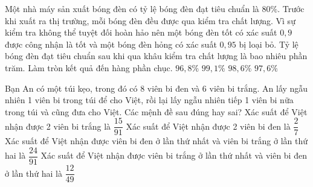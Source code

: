 \begin{ex}%
    Một nhà máy sản xuất bóng đèn có tỷ lệ bóng đèn đạt tiêu chuẩn là $80\%$. Trước khi xuất ra thị trường, mỗi bóng đèn đều được qua kiểm tra chất lượng. Vì sự kiểm tra không thể tuyệt đối hoàn hảo nên một bóng đèn tốt có xác suất $0,9$ được công nhận là tốt và một bóng đèn hỏng có xác suất $0,95$ bị loại bỏ. Tỷ lệ bóng đèn đạt tiêu chuẩn sau khi qua khâu kiểm tra chất lượng là bao nhiêu phần trăm. Làm tròn kết quả đến hàng phần chục.
    \choice
    {$96,8\%$}
    {$99,1\%$}
    {\True $98,6\%$}
    {$97,6\%$}
\end{ex}
\begin{ex}%
    Bạn An có một túi kẹo, trong đó có 8 viên bi đen và 6 viên bi trắng. An lấy ngẫu nhiên 1 viên bi trong túi để cho Việt, rồi lại lấy ngẫu nhiên tiếp 1 viên bi nữa trong túi và cũng đưa cho Việt. Các mệnh đề sau đúng hay sai?
    \choiceTF
    {\True Xác suất để Việt nhận được 2 viên bi trắng là $\dfrac{15}{91}$}
    { Xác suất để Việt nhận được 2 viên bi đen là $\dfrac{2}{7}$}
    {\True Xác suất để Việt nhận được viên bi đen ở lần thứ nhất và viên bi trắng ở lần thứ hai là $\dfrac{24}{91}$}
    { Xác suất để Việt nhận được viên bi trắng ở lần thứ nhất và viên bi đen ở lần thứ hai là $\dfrac{12}{49}$}
\end{ex}
